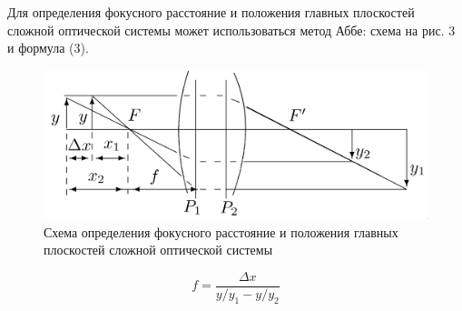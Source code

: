 \documentclass{article}
\begin{document}
\noindent
Для определения фокусного расстояние и положения главных плоскостей сложной оптической системы может использоваться метод Аббе: схема на рис. 3 и формула (3).

\begin{figure}[h]
    \centering
    \includegraphics[scale=0.3]{pic_3.png}
    \caption{Схема определения фокусного расстояние и положения главных плоскостей сложной оптической системы}
\end{figure}

\begin{equation}
    f = \frac{\Delta x}{y / y_1 - y / y_2}    
\end{equation}


\end{document}
